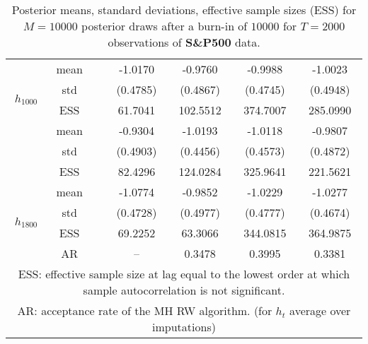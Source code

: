 {\begin{table}
\begin{tabular}{ccc cc cc}
\multirow{4}{*}{$h_{1000}$}   & mean &   & -1.0170  & -0.9760  & -0.9988  & -1.0023  \\ [0.75ex]
 & std &   & (0.4785)  & (0.4867)  & (0.4745)  & (0.4948)  \\ [0.75ex]
 & ESS  &   & 61.7041  & 102.5512  & 374.7007  & 285.0990  \\ [1.3ex] 
\multirow{4}{*}{$h_{1400}$}   & mean &   & -0.9304  & -1.0193  & -1.0118  & -0.9807  \\ [0.75ex]
 & std &   & (0.4903)  & (0.4456)  & (0.4573)  & (0.4872)  \\ [0.75ex]
 & ESS  &   & 82.4296  & 124.0284  & 325.9641  & 221.5621  \\ [1.3ex] 
\multirow{4}{*}{$h_{1800}$}   & mean &   & -1.0774  & -0.9852  & -1.0229  & -1.0277  \\ [0.75ex]
 & std &   & (0.4728)  & (0.4977)  & (0.4777)  & (0.4674)  \\ [0.75ex]
 & ESS  &   & 69.2252  & 63.3066  & 344.0815  & 364.9875  \\ [1.3ex] 
 & AR & & --  & 0.3478  & 0.3995  & 0.3381 \\ \hline 
\hline 
\multicolumn{7}{p{11cm}}{\footnotesize{ESS: effective sample size at lag equal to the lowest order at which sample autocorrelation is not significant.}}  \\ 
\multicolumn{7}{p{11cm}}{\footnotesize{AR: acceptance rate of the MH RW algorithm. (for $h_{t}$ average over imputations)}}  \\ 
\end{tabular}
 \caption{Posterior means, standard deviations, effective sample sizes (ESS)  for $M=10000$ posterior draws after a burn-in of $10000$ for $T=2000$ observations of \textbf{S\&P500} data.}
\label{tab:SV_results_GSPC}  
\end{table}
}